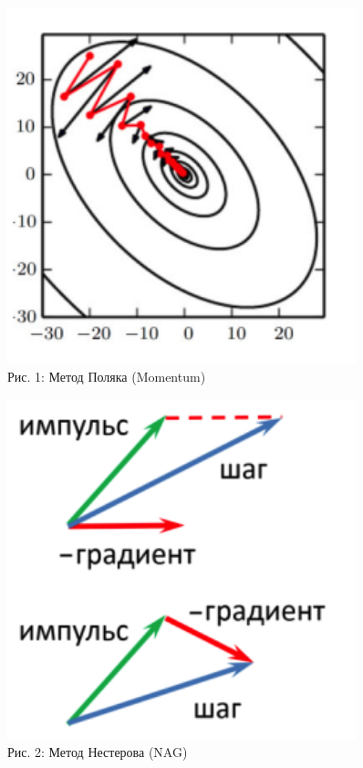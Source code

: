 \begin{figure}[h!]
	\centering
	\begin{minipage}[t]{0.45\textwidth}
		\centering
		\includegraphics[width=0.9\textwidth]{chapters/neural/images/polyak.png}
		\\[0.5em]
		Рис. 1: Метод Поляка (Momentum)
	\end{minipage}%
	\hfill
	\begin{minipage}[t]{0.45\textwidth}
		\centering
		\includegraphics[width=0.9\textwidth]{chapters/neural/images/nesterov.png}
		\\[0.5em]
		Рис. 2: Метод Нестерова (NAG)
	\end{minipage}
\end{figure}

